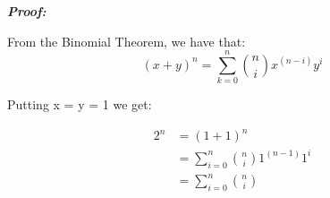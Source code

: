 \documentclass{article}
\begin{document}
\textbf{\textit{Proof:}}

From the Binomial Theorem, we have that:
\[
    {(x+y)}^n = \sum_{k=0}^{n}\binom{n}{i}x^{(n-i)}y^i
\]

Putting x = y = 1 we get:

\begin{align*}
    2^{n} &= {(1+1)}^n \\
          &= \sum_{i=0}^n\binom{n}{i}1^{(n-1)}1^i \\
          &= \sum_{i=0}^n\binom{n}{i}
%
\end{align*}
\end{document}
